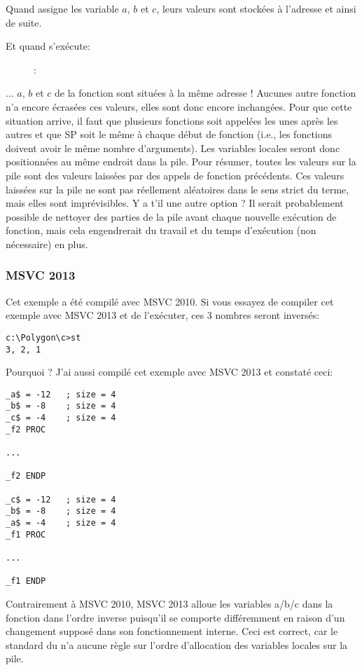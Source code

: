 Quand  assigne les variable $a$, $b$ et $c$, leurs valeurs sont stockées à l'adresse  et ainsi de suite.

\clearpage
Et quand  s'exécute:

\begin{figure}[H]
\centering
{}
\caption{\olly: }
\label{fig:stack_noise_olly2}
\end{figure}

... $a$, $b$ et $c$ de la fonction  sont situées à la même adresse !
Aucunes autre fonction n'a encore écrasées ces valeurs, elles sont donc encore inchangées. Pour que cette situation arrive, il faut que plusieurs fonctions soit appelées les unes après les autres et que \ac{SP} soit le même à chaque début de fonction (i.e., les fonctions doivent avoir le même nombre d'arguments). Les variables locales seront donc positionnées au même endroit dans la pile. Pour résumer, toutes les valeurs sur la pile sont des valeurs laissées par des appels de fonction précédents. Ces valeurs laissées sur la pile ne sont pas réellement aléatoires dans le sens strict du terme, mais elles sont imprévisibles.
Y a t'il une autre option ?
Il serait probablement possible de nettoyer des parties de la pile avant chaque nouvelle exécution de fonction, mais cela engendrerait du travail et du temps d'exécution (non nécessaire) en plus.

\subsubsection{MSVC 2013}

Cet exemple a été compilé avec MSVC 2010.
Si vous essayez de compiler cet exemple avec MSVC 2013 et de l'exécuter, ces 3 nombres seront inversés:%

\begin{lstlisting}
c:\Polygon\c>st
3, 2, 1
\end{lstlisting}

Pourquoi ?
J'ai aussi compilé cet exemple avec MSVC 2013 et constaté ceci: 


\begin{lstlisting}[caption=MSVC 2013,style=customasmx86]
_a$ = -12	; size = 4
_b$ = -8	; size = 4
_c$ = -4	; size = 4
_f2	PROC

...

_f2	ENDP

_c$ = -12	; size = 4
_b$ = -8	; size = 4
_a$ = -4	; size = 4
_f1	PROC

...

_f1	ENDP
\end{lstlisting}

Contrairement à MSVC 2010, MSVC 2013 alloue les variables a/b/c dans la fonction  dans l'ordre inverse puisqu'il se comporte différemment en raison d'un changement supposé dans son fonctionnement interne.%
Ceci est correct, car le standard du \CCpp n'a aucune règle sur l'ordre d'allocation des variables locales sur la pile.
